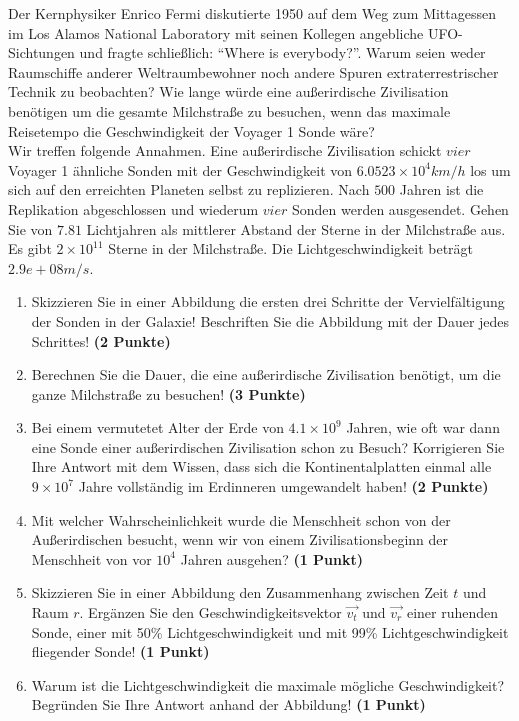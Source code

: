 \documentclass[a4paper, 10pt]{scrartcl}\usepackage[]{graphicx}\usepackage[]{xcolor}
\begin{document}
Der Kernphysiker Enrico Fermi diskutierte 1950 auf dem Weg zum Mittagessen
im Los Alamos National Laboratory mit seinen Kollegen angebliche
UFO-Sichtungen und fragte schlie{\ss}lich: "`Where is everybody?"'. Warum seien
weder Raumschiffe anderer Weltraumbewohner noch andere Spuren
extraterrestrischer Technik zu beobachten? Wie lange w{\"u}rde eine au{\ss}erirdische
Zivilisation ben{\"o}tigen um die gesamte Milchstra{\ss}e zu
besuchen, wenn das maximale Reisetempo die Geschwindigkeit der Voyager 1 Sonde w{\"a}re?\\[-1ex]

Wir treffen folgende Annahmen. Eine au{\ss}erirdische Zivilisation schickt $vier$
Voyager 1 {\"a}hnliche Sonden mit der Geschwindigkeit von $\ensuremath{6.0523\times 10^{4}}km/h$
los um sich auf den erreichten Planeten selbst zu replizieren. Nach
$500$ Jahren ist die Replikation abgeschlossen und wiederum
$vier$ Sonden werden ausgesendet. Gehen Sie von
$7.81$ Lichtjahren als mittlerer Abstand der Sterne in der
Milchstra{\ss}e aus. Es gibt $\ensuremath{2\times 10^{11}}$ Sterne in der Milchstra{\ss}e. Die
Lichtgeschwindigkeit betr{\"a}gt $2.9e+08m/s$.

\begin{enumerate}
\item Skizzieren Sie in einer Abbildung die ersten drei Schritte der
  Vervielf{\"a}ltigung der Sonden in der Galaxie! Beschriften Sie die Abbildung
  mit der Dauer jedes Schrittes! \textbf{(2 Punkte)}
\item Berechnen Sie die Dauer, die eine au{\ss}erirdische Zivilisation
  ben{\"o}tigt, um die ganze Milchstra{\ss}e zu besuchen! \textbf{(3 Punkte)}
\item Bei einem vermutetet Alter der Erde von $\ensuremath{4.1\times 10^{9}}$ Jahren,
  wie oft war dann eine Sonde einer au{\ss}erirdischen Zivilisation schon zu
  Besuch? Korrigieren Sie Ihre Antwort mit dem Wissen, dass sich die
  Kontinentalplatten einmal alle $\ensuremath{9\times 10^{7}}$ Jahre vollst{\"a}ndig im
  Erdinneren umgewandelt haben! \textbf{(2 Punkte)}
\item Mit welcher Wahrscheinlichkeit wurde die Menschheit schon von der
  Au{\ss}erirdischen besucht, wenn wir von einem Zivilisationsbeginn der
  Menschheit von vor $\ensuremath{10^{4}}$ Jahren ausgehen? \textbf{(1 Punkt)}
\item Skizzieren Sie in einer Abbildung den Zusammenhang zwischen Zeit $t$
  und Raum $r$. Erg{\"a}nzen Sie den Geschwindigkeitsvektor $\vec{v_t}$ und
  $\vec{v_r}$ einer ruhenden Sonde, einer mit 50\% Lichtgeschwindigkeit und
  mit 99\% Lichtgeschwindigkeit fliegender Sonde! \textbf{(1 Punkt)}
\item Warum ist die Lichtgeschwindigkeit die maximale m{\"o}gliche Geschwindigkeit?
Begr{\"u}nden Sie Ihre Antwort anhand der Abbildung!  \textbf{(1 Punkt)}
\end{enumerate}
\end{document}
